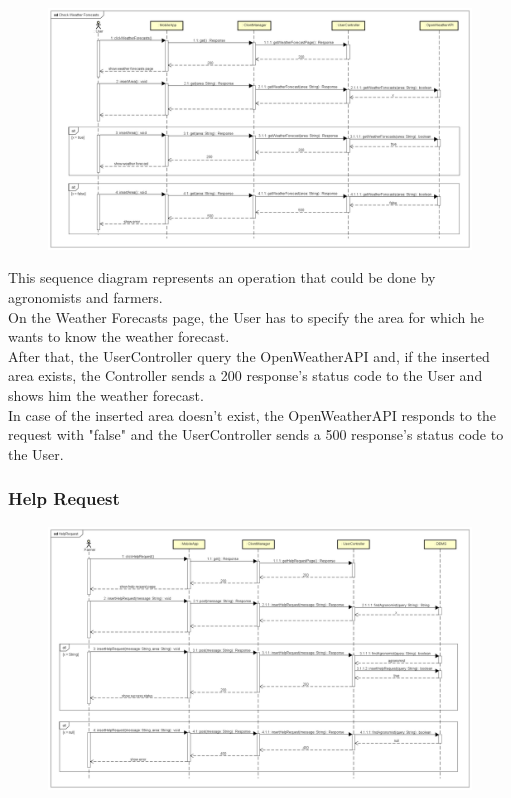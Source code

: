 \begin{figure}[H]
    \begin{center}
        \includegraphics[width=\textwidth]{Images/SequenceDiagrams/CheckWeatherForecastsDD.png}
    \end{center}
\end{figure}

This sequence diagram represents an operation that could be done by agronomists and farmers.\\
On the Weather Forecasts page, the User has to specify the area for which he wants to know the weather forecast.\\
After that, the UserController query the OpenWeatherAPI and, if the inserted area exists, 
the Controller sends a 200 response's status code to the User and shows him the weather forecast.\\
In case of the inserted area doesn't exist, the OpenWeatherAPI responds to the request 
with "false" and the UserController sends a 500 response's status code to the User.


\newpage
\subsubsection{Help Request}

\begin{figure}[H]
    \begin{center}
        \includegraphics[width=\textwidth]{Images/SequenceDiagrams/HelpRequestDD.png}
    \end{center}
\end{figure}

